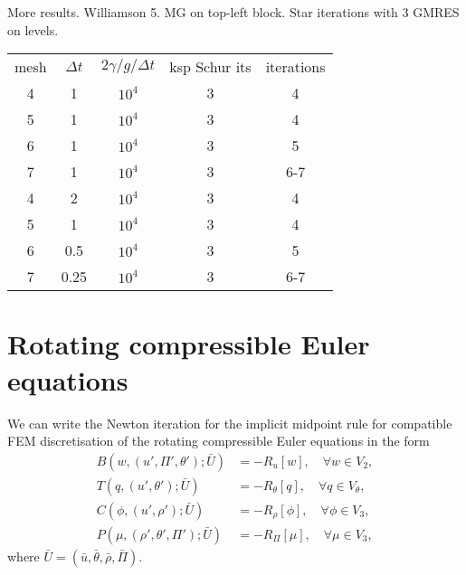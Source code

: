 \documentclass{article}
\begin{document}
More results. Williamson 5. MG on top-left block. Star iterations with
3 GMRES on levels.\\
\begin{tabular}{|c|c|c|c|c|}
  \hline
  mesh & $\Delta t$ & $2\gamma/g/\Delta t$ & ksp Schur its & iterations \\
  4 & 1 & $10^4$ & 3 & 4 \\
  5 & 1 & $10^4$ & 3 & 4 \\
  6 & 1 & $10^4$ & 3 & 5 \\
  7 & 1 & $10^4$ & 3 & 6-7 \\
  \hline
  4 & 2 & $10^4$ & 3 & 4 \\
  5 & 1 & $10^4$ & 3 & 4 \\
  6 & 0.5 & $10^4$ & 3 & 5 \\
  7 & 0.25 & $10^4$ & 3 & 6-7 \\
  \hline
\end{tabular}



\section{Rotating compressible Euler equations}

We can write the Newton iteration for the implicit midpoint rule for
compatible FEM discretisation of the rotating compressible Euler equations
in the form
\begin{align}
  B(w,(u',\Pi',\theta'); \bar{U}) & = -R_u[w], \quad \forall w\in V_2, \\
  T(q,(u',\theta'); \bar{U}) & = -R_\theta[q], \quad \forall q\in V_\theta, \\
  C(\phi,(u',\rho'); \bar{U}) & = -R_\rho[\phi], \quad \forall \phi \in V_3, \\
  P(\mu,(\rho',\theta',\Pi'); \bar{U}) & = -R_\Pi[\mu], \quad
  \forall \mu \in V_3,
\end{align}
where $\bar{U}=(\bar{u},\bar{\theta},\bar{\rho},\bar{\Pi})$.
\end{document}
